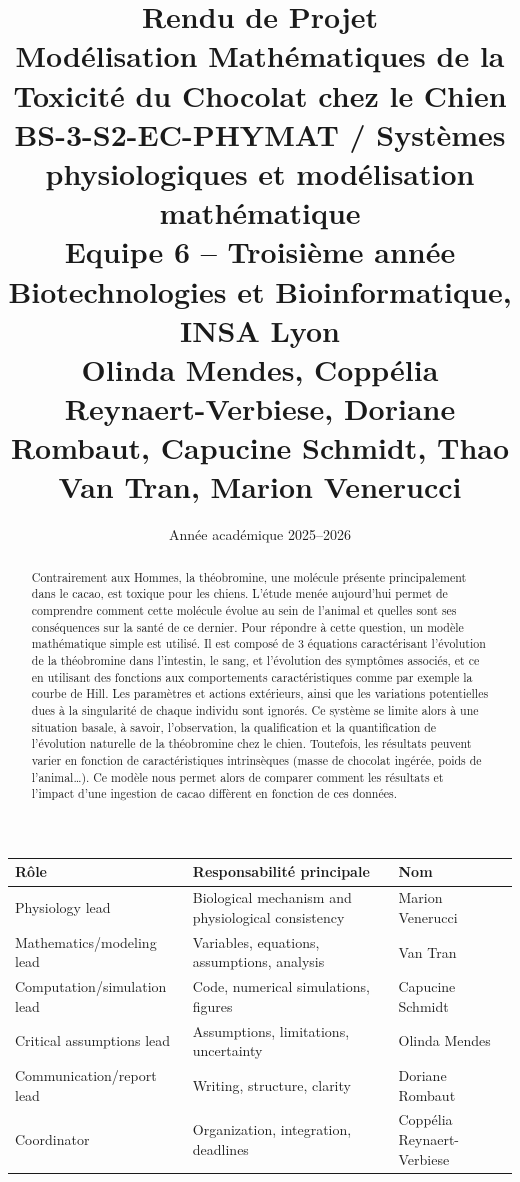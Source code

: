 \documentclass[11pt,a4paper]{article}
\title{
    \textbf{Rendu de Projet}\\
    \textbf{Modélisation Mathématiques de la Toxicité du Chocolat chez le Chien}\\[0.5em]
    \large BS-3-S2-EC-PHYMAT / Systèmes physiologiques et modélisation mathématique\\[0.5em]
    \large Equipe 6 -- Troisième année Biotechnologies et Bioinformatique, INSA Lyon\\[0.5em]
    \large Olinda Mendes, Coppélia Reynaert-Verbiese, Doriane Rombaut, Capucine Schmidt, Thao Van Tran, Marion Venerucci
}
\date{Année académique 2025--2026}
\begin{document}
\maketitle

\begin{center}
\begin{tabular}{p{4cm}p{6cm}p{4cm}}
\toprule
\textbf{Rôle} & \textbf{Responsabilité principale} & \textbf{Nom} \\
\midrule
Physiology lead & Biological mechanism and physiological consistency & Marion Venerucci \\
Mathematics/modeling lead & Variables, equations, assumptions, analysis & Van Tran \\
Computation/simulation lead & Code, numerical simulations, figures & Capucine Schmidt \\
Critical assumptions lead & Assumptions, limitations, uncertainty & Olinda Mendes \\
Communication/report lead & Writing, structure, clarity & Doriane Rombaut \\
Coordinator & Organization, integration, deadlines & Coppélia Reynaert-Verbiese \\
\bottomrule
\end{tabular}
\end{center}


\vspace{1em}

\begin{abstract}

Contrairement aux Hommes, la théobromine, une molécule présente principalement dans le 
cacao, est toxique pour les chiens. L'étude menée aujourd'hui permet de comprendre comment 
cette molécule évolue au sein de l'animal et quelles sont ses conséquences sur la santé de 
ce dernier. Pour répondre à cette question, un modèle mathématique simple est utilisé. Il 
est composé de 3 équations caractérisant l'évolution de la théobromine dans l'intestin, le 
sang, et l'évolution des symptômes associés, et ce en utilisant des fonctions aux 
comportements caractéristiques comme par exemple la courbe de Hill.  Les paramètres et 
actions extérieurs, ainsi que les variations potentielles dues à la singularité de chaque 
individu sont ignorés. Ce système se limite alors à une situation basale, à savoir, 
l'observation, la qualification et la quantification de l'évolution naturelle de la 
théobromine chez le chien. Toutefois, les résultats peuvent varier en fonction de 
caractéristiques intrinsèques (masse de chocolat ingérée, poids de l'animal…). Ce modèle 
nous permet alors de comparer comment les résultats et l'impact d'une ingestion de cacao 
diffèrent en fonction de ces données.

\end{abstract}
\end{document}
